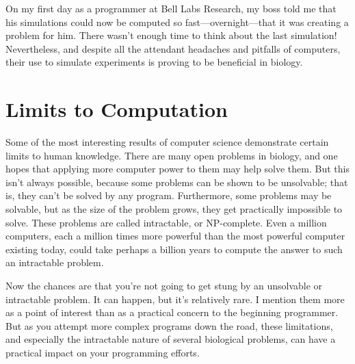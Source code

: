 On my first day as a programmer at Bell Labs Research, my boss told me that his simulations could now be computed so fast—overnight—that it was creating a problem for him. There wasn't enough time to think about the last simulation! Nevertheless, and despite all the attendant headaches and pitfalls of computers, their use to simulate experiments is proving to be beneficial in biology. 

\section{Limits to Computation}
Some of the most interesting results of computer science demonstrate certain limits to human knowledge. There are many open problems in biology, and one hopes that applying more computer power to them may help solve them. But this isn't always possible, because some problems can be shown to be unsolvable; that is, they can't be solved by any program. Furthermore, some problems may be solvable, but as the size of the problem grows, they get practically impossible to solve. These problems are called intractable, or NP-complete. Even a million computers, each a million times more powerful than the most powerful computer existing today, could take perhaps a billion years to compute the answer to such an intractable problem.

Now the chances are that you're not going to get stung by an unsolvable or intractable problem. It can happen, but it's relatively rare. I mention them more as a point of interest than as a practical concern to the beginning programmer. But as you attempt more complex programs down the road, these limitations, and especially the intractable nature of several biological problems, can have a practical impact on your programming efforts. 
